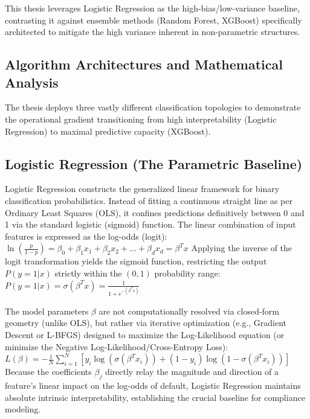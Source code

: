 This thesis leverages Logistic Regression as the high-bias/low-variance
baseline, contrasting it against ensemble methods (Random Forest,
XGBoost) specifically architected to mitigate the high variance inherent
in non-parametric structures.

\hypertarget{algorithm-architectures-and-mathematical-analysis}{%
\subsection{Algorithm Architectures and Mathematical
Analysis}\label{algorithm-architectures-and-mathematical-analysis}}

The thesis deploys three vastly different classification topologies to
demonstrate the operational gradient transitioning from high
interpretability (Logistic Regression) to maximal predictive capacity
(XGBoost).

\hypertarget{logistic-regression-the-parametric-baseline}{%
\subsection{Logistic Regression (The Parametric
Baseline)}\label{logistic-regression-the-parametric-baseline}}

Logistic Regression constructs the generalized linear framework for
binary classification probabilistics. Instead of fitting a continuous
straight line as per Ordinary Least Squares (OLS), it confines
predictions definitively between 0 and 1 via the standard logistic
(sigmoid) function. The linear combination of input features is
expressed as the log-odds (logit):
\(\ln\left(\frac{p}{1-p}\right) = \beta_0 + \beta_1 x_1 + \beta_2 x_2 + ... + \beta_d x_d = \beta^T x\)
Applying the inverse of the logit transformation yields the sigmoid
function, restricting the output \(P(y=1|x)\) strictly within the
\((0, 1)\) probability range:
\(P(y=1 | x) = \sigma(\beta^T x) = \frac{1}{1 + e^{-(\beta^T x)}}\)

The model parameters \(\beta\) are not computationally resolved via
closed-form geometry (unlike OLS), but rather via iterative optimization
(e.g., Gradient Descent or L-BFGS) designed to maximize the
Log-Likelihood equation (or minimize the Negative
Log-Likelihood/Cross-Entropy Loss):
\(L(\beta) = -\frac{1}{N} \sum_{i=1}^{N} [y_i \log(\sigma(\beta^T x_i)) + (1 - y_i) \log(1 - \sigma(\beta^T x_i))]\)
Because the coefficients \(\beta_j\) directly relay the magnitude and
direction of a feature's linear impact on the log-odds of default,
Logistic Regression maintains absolute intrinsic interpretability,
establishing the crucial baseline for compliance modeling.

